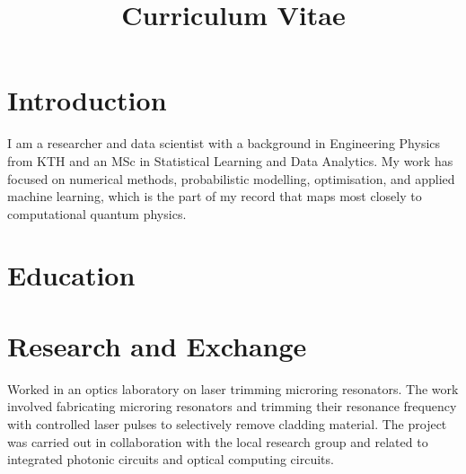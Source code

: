 \documentclass[11pt,a4paper]{moderncv}
\title{Curriculum Vitae}
\begin{document}
\makecvtitle

\section*{Introduction}
I am a researcher and data scientist with a background in Engineering Physics from KTH and an MSc in Statistical Learning and Data Analytics. My work has focused on numerical methods, probabilistic modelling, optimisation, and applied machine learning, which is the part of my record that maps most closely to computational quantum physics.

\section{Education}




\section{Research and Exchange}

\label{sec:zju}
 {
    Worked in an optics laboratory on laser trimming microring resonators. The work involved fabricating microring resonators and trimming their resonance frequency with controlled laser pulses to selectively remove cladding material. The project was carried out in collaboration with the local research group and related to integrated photonic circuits and optical computing circuits.
}{}
\end{document}
